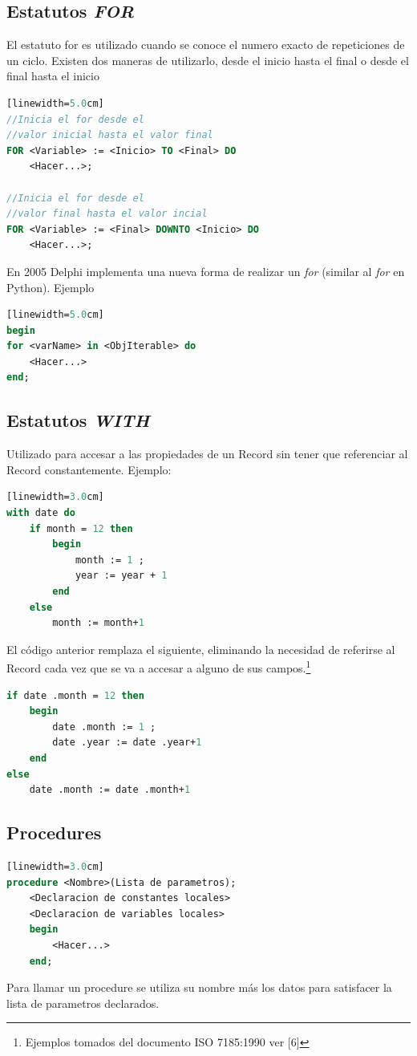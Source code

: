 \documentclass[10pt,journal,compsoc]{IEEEtran}
\begin{document}
\subsection{Estatutos \emph{FOR}}
El estatuto for es utilizado cuando se conoce el numero exacto de repeticiones de un ciclo. Existen dos maneras de utilizarlo, desde el inicio hasta el final o desde el final hasta el inicio
\begin{lstlisting}[language=Pascal, caption = {Sintaxis de un FOR}][linewidth=5.0cm]
//Inicia el for desde el 
//valor inicial hasta el valor final
FOR <Variable> := <Inicio> TO <Final> DO
	<Hacer...>;

//Inicia el for desde el 
//valor final hasta el valor incial
FOR <Variable> := <Final> DOWNTO <Inicio> DO
	<Hacer...>;
\end{lstlisting}
\vspace{0.5cm}
En 2005 Delphi implementa una nueva forma de realizar un \emph{for} (similar al \emph{for} en Python). Ejemplo
\begin{lstlisting}[language=Pascal, caption = {Sintaxis de un FOR en Delphi}][linewidth=5.0cm]
begin
for <varName> in <ObjIterable> do
	<Hacer...>
end;
\end{lstlisting}

\vspace{0.7cm}

\subsection{Estatutos \emph{WITH}}
Utilizado para accesar a las propiedades de un Record sin tener que referenciar al Record constantemente. Ejemplo:
\begin{lstlisting}[language=Pascal, caption = {Sintaxis de un WITH}][linewidth=3.0cm]
with date do
	if month = 12 then
		begin 
			month := 1 ; 
			year := year + 1
		end
	else 
		month := month+1
\end{lstlisting}
El c\'odigo anterior remplaza el siguiente, eliminando la necesidad de referirse al Record cada vez que se va a accesar a alguno de sus campos.\footnote{Ejemplos tomados del documento ISO 7185:1990 ver [6]}
\begin{lstlisting}[language=Pascal]
if date .month = 12 then
	begin 
		date .month := 1 ; 
		date .year := date .year+1
	end
else 
	date .month := date .month+1
\end{lstlisting}

\subsection{Procedures}
\begin{lstlisting}[language=Pascal, caption = {Sintaxis de un Procedure}][linewidth=3.0cm]
procedure <Nombre>(Lista de parametros);
	<Declaracion de constantes locales>
	<Declaracion de variables locales>
	begin
		<Hacer...>
	end;
\end{lstlisting}
Para llamar un procedure se utiliza su nombre m\'as los datos para satisfacer la lista de parametros declarados. 
\end{document}
